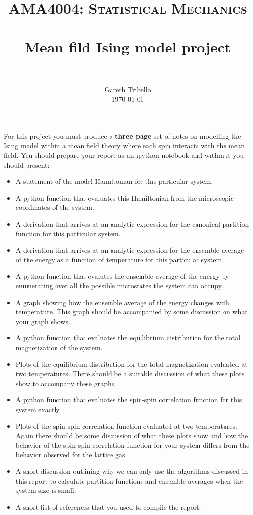 \documentclass[paper=a4, fontsize=11pt]{scrartcl}
\title{\usefont{OT1}{bch}{b}{n} \normalfont \normalsize \textsc{AMA4004:
Statistical Mechanics} \\ [25pt] \horrule{0.5pt} \\[0.4cm] 
\huge Mean fild Ising model project \\
\horrule{2pt} \\[0.25cm]
}
\author{ \normalfont
\normalsize
        Gareth Tribello \\[-3pt] \normalsize
        \today
}
\date{}
\numberwithin{equation}{section}
\numberwithin{figure}{section}
\numberwithin{table}{section}
\begin{document}
\maketitle

For this project you must produce a {\bfseries three page} set of notes on modelling the Ising model within a mean field theory where each spin interacts with the mean field.  You should prepare your report as an ipython notebook and within 
it you should present:

\begin{itemize}
 \item A statement of the model Hamiltonian for this particular system.
 \item A python function that evaluates this Hamiltonian from the microscopic coordinates of the system. 
 \item A derivation that arrives at an analytic expression for the canonical partition function for this particular system.
 \item A derivation that arrives at an analytic expression for the ensemble average of the energy as a function of temperature for this particular system.
 \item A python function that evalutes the ensemble average of the energy by enumerating over all the possible microstates the system can occupy.  
 \item A graph showing how the ensemble average of the energy changes with temperature.  This graph should be accompanied by some discussion on what your graph shows.
 \item A python function that evaluates the equilibrium distribution for the total magnetization of the system.
 \item Plots of the equilibrium distribution for the total magnetization evaluated at two temperatures.  There should be a suitable discussion of what these plots show to accompany these graphs.
 \item A python function that evaluates the spin-spin correlation function for this system exactly.
 \item Plots of the spin-spin correlation function evaluated at two temperatures.  Again there should be some discussion of what these plots show and how the behavior of the spin-spin correlation function for your system differs from the behavior observed for the lattice gas.
 \item A short discussion outlining why we can only use the algorithms discussed in this report to calculate partition functions and ensemble averages when the system size is small.
 \item A short list of references that you used to compile the report.
\end{itemize}
\end{document}
